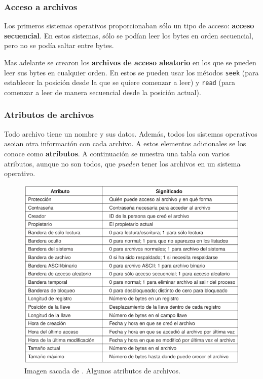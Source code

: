 \documentclass[12pt]{article}
\begin{document}
  \subsubsection{Acceso a archivos}
  Los primeros sistemas operativos proporcionaban sólo un tipo de acceso: \textbf{acceso secuencial}. En estos sistemas, sólo se podían leer los bytes en orden secuencial, pero no se podía saltar entre bytes.

  Mas adelante se crearon los \textbf{archivos de acceso aleatorio} en los que se pueden leer sus bytes en cualquier orden. En estos se pueden usar los métodos \verb|seek| (para establecer la posición desde la que se quiere comenzar a leer) y \verb|read| (para comenzar a leer de manera secuencial desde la posición actual).

  \subsubsection{Atributos de archivos}
  Todo archivo tiene un nombre y sus datos. Además, todos los sistemas operativos asoian otra información con cada archivo. A estos elementos adicionales se los conoce como \textbf{atributos}. A continuación se muestra una tabla con varios atributos, aunque no son todos, que \textit{pueden} tener los archivos en un sistema operativo.

  \begin{figure}[H]
    \centering
    \includegraphics[width=0.8\linewidth]{imagenes/atributos-archivos.png}
    \caption{Imagen sacada de \parencite{tanenbaum}. Algunos atributos de archivos.}
    \label{fig:atributos-archivos}
  \end{figure}
  
\end{document}
